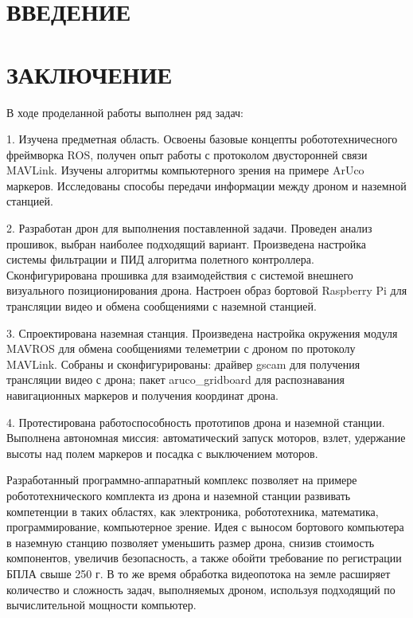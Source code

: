\documentclass[a4paper,12pt]{article}
\begin{document}
\thispagestyle{empty} %
\pagebreak

\setcounter{page}{3}
\section*{\centering ВВЕДЕНИЕ}
\pagebreak
\pagebreak
\pagebreak
\pagebreak
\pagebreak
\pagebreak

\section*{\centering ЗАКЛЮЧЕНИЕ}
В ходе проделанной работы выполнен ряд задач:

	1. Изучена предметная область. Освоены базовые концепты робототехничесного фреймворка ROS, получен опыт работы с протоколом  двусторонней связи MAVLink. Изучены алгоритмы компьютерного зрения на примере ArUco маркеров. Исследованы способы передачи информации между дроном и наземной станцией.
	
	2. Разработан дрон для выполнения поставленной задачи. Проведен анализ прошивок, выбран наиболее подходящий вариант. Произведена настройка системы фильтрации и ПИД алгоритма полетного контроллера. Сконфигурирована прошивка для взаимодействия с системой внешнего визуального позиционирования дрона. Настроен образ бортовой Raspberry Pi для трансляции видео и обмена сообщениями с наземной станцией.
	
	3. Спроектирована наземная станция. Произведена настройка окружения модуля MAVROS для обмена сообщениями телеметрии с дроном по протоколу MAVLink. Собраны и сконфигурированы: драйвер gscam для получения трансляции видео с дрона; пакет aruco\_grid\-board для распознавания навигационных маркеров и получения координат дрона.
	
	4. Протестирована работоспособность прототипов дрона и наземной станции. Выполнена автономная миссия: автоматический запуск моторов, взлет, удержание высоты над полем маркеров и посадка с выключением моторов.


Разработанный программно-аппаратный комплекс позволяет на примере робототехнического комплекта из дрона и наземной станции развивать компетенции в таких областях, как электроника, робототехника, математика, программирование, компьютерное зрение. Идея с выносом бортового компьютера в наземную станцию позволяет уменьшить размер дрона, снизив стоимость компонентов, увеличив безопасность, а также обойти требование по регистрации БПЛА свыше 250 г. В то же время обработка видеопотока на земле расширяет количество и сложность задач, выполняемых дроном, используя подходящий по вычислительной мощности компьютер.
\end{document}
